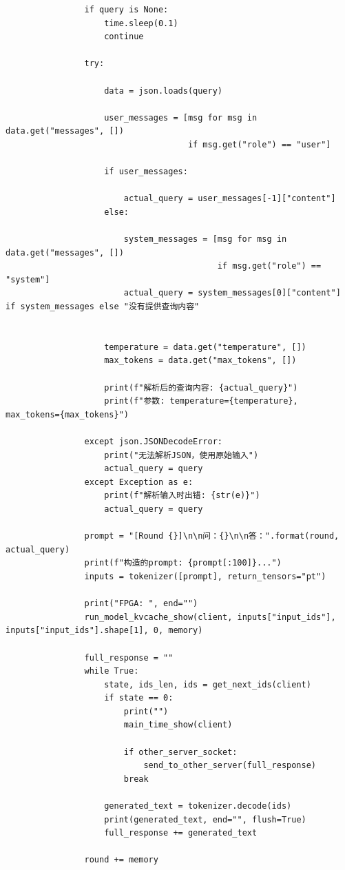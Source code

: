 \documentclass[AutoFakeBold,AutoFakeSlant,language=chinese,degree=bachelor]{sustechthesis}
\begin{document}
\begin{itemize}
\begin{lstlisting}
                if query is None:
                    time.sleep(0.1)
                    continue
        
                try:
        
                    data = json.loads(query)
        
                    user_messages = [msg for msg in data.get("messages", [])
                                     if msg.get("role") == "user"]
        
                    if user_messages:
        
                        actual_query = user_messages[-1]["content"]
                    else:
        
                        system_messages = [msg for msg in data.get("messages", [])
                                           if msg.get("role") == "system"]
                        actual_query = system_messages[0]["content"] if system_messages else "没有提供查询内容"
        
        
                    temperature = data.get("temperature", [])
                    max_tokens = data.get("max_tokens", [])
        
                    print(f"解析后的查询内容: {actual_query}")
                    print(f"参数: temperature={temperature}, max_tokens={max_tokens}")
        
                except json.JSONDecodeError:
                    print("无法解析JSON，使用原始输入")
                    actual_query = query
                except Exception as e:
                    print(f"解析输入时出错: {str(e)}")
                    actual_query = query
        
                prompt = "[Round {}]\n\n问：{}\n\n答：".format(round, actual_query)
                print(f"构造的prompt: {prompt[:100]}...")
                inputs = tokenizer([prompt], return_tensors="pt")
        
                print("FPGA: ", end="")
                run_model_kvcache_show(client, inputs["input_ids"], inputs["input_ids"].shape[1], 0, memory)
        
                full_response = ""
                while True:
                    state, ids_len, ids = get_next_ids(client)
                    if state == 0:
                        print("")
                        main_time_show(client)
                        
                        if other_server_socket:
                            send_to_other_server(full_response)
                        break
        
                    generated_text = tokenizer.decode(ids)
                    print(generated_text, end="", flush=True)
                    full_response += generated_text
        
                round += memory
        \end{lstlisting}
\end{itemize}
\end{document}
